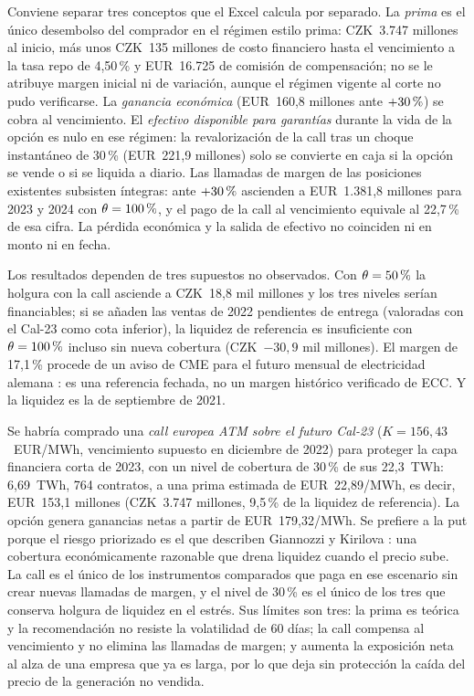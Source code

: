 \documentclass[11pt,letterpaper]{article}
\theoremstyle{plain}
\theoremstyle{definition}
\theoremstyle{remark}
\numberwithin{equation}{section}
\newcommand{\pc}{\mbox{\,\%}}
\begin{document}
Conviene separar tres conceptos que el Excel calcula por separado. La \emph{prima} es el único desembolso del comprador en el régimen estilo prima: CZK~3.747 millones al inicio, más unos CZK~135 millones de costo financiero hasta el vencimiento a la tasa repo de 4,50\pc{} \cite{cnb_2022} y EUR~16.725 de comisión de compensación; no se le atribuye margen inicial ni de variación, aunque el régimen vigente al corte no pudo verificarse. La \emph{ganancia económica} (EUR~160,8 millones ante $+30\pc{}$) se cobra al vencimiento. El \emph{efectivo disponible para garantías} durante la vida de la opción es nulo en ese régimen: la revalorización de la call tras un choque instantáneo de 30\pc{} (EUR~221,9 millones) solo se convierte en caja si la opción se vende o si se liquida a diario. Las llamadas de margen de las posiciones existentes subsisten íntegras: ante $+30\pc{}$ ascienden a EUR~1.381,8 millones para 2023 y 2024 con $\theta=100\pc{}$, y el pago de la call al vencimiento equivale al 22,7\pc{} de esa cifra. La pérdida económica y la salida de efectivo no coinciden ni en monto ni en fecha.

Los resultados dependen de tres supuestos no observados. Con $\theta=50\pc{}$ la holgura con la call asciende a CZK~18,8 mil millones y los tres niveles serían financiables; si se añaden las ventas de 2022 pendientes de entrega (valoradas con el Cal-23 como cota inferior), la liquidez de referencia es insuficiente con $\theta=100\pc{}$ incluso sin nueva cobertura (CZK~$-30{,}9$ mil millones). El margen de 17,1\pc{} procede de un aviso de CME para el futuro mensual de electricidad alemana \cite{cme}: es una referencia fechada, no un margen histórico verificado de ECC. Y la liquidez es la de septiembre de 2021.

Se habría comprado una \emph{call europea ATM sobre el futuro Cal-23} ($K=156{,}43$~EUR/MWh, vencimiento supuesto en diciembre de 2022) para proteger la capa financiera corta de 2023, con un nivel de cobertura de 30\pc{} de sus 22,3~TWh: 6,69~TWh, 764 contratos, a una prima estimada de EUR~22,89/MWh, es decir, EUR~153,1 millones (CZK~3.747 millones, 9,5\pc{} de la liquidez de referencia). La opción genera ganancias netas a partir de EUR~179,32/MWh. Se prefiere a la put porque el riesgo priorizado es el que describen Giannozzi y Kirilova \cite{GIANNOZZI2026107700}: una cobertura económicamente razonable que drena liquidez cuando el precio sube. La call es el único de los instrumentos comparados que paga en ese escenario sin crear nuevas llamadas de margen, y el nivel de 30\pc{} es el único de los tres que conserva holgura de liquidez en el estrés. Sus límites son tres: la prima es teórica y la recomendación no resiste la volatilidad de 60 días; la call compensa al vencimiento y no elimina las llamadas de margen; y aumenta la exposición neta al alza de una empresa que ya es larga, por lo que deja sin protección la caída del precio de la generación no vendida.
\end{document}
